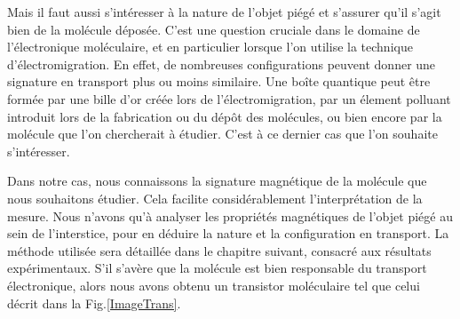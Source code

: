 Mais il faut aussi s'intéresser à la nature de l'objet piégé et s'assurer qu'il s'agit bien de la molécule déposée. C'est une question cruciale dans le domaine de l'électronique moléculaire, et en particulier lorsque l'on utilise la technique d'électromigration. En effet, de nombreuses configurations peuvent donner une signature en transport plus ou moins similaire. Une boîte quantique peut \^etre formée par une bille d'or créée lors de l'électromigration, par un élement polluant introduit lors de la fabrication ou du dép\^ot des molécules, ou bien encore par la molécule que l'on chercherait à étudier. C'est à ce dernier cas que l'on souhaite s'intéresser.

Dans notre cas, nous connaissons la signature magnétique de la molécule que nous souhaitons étudier. Cela facilite considérablement l'interprétation de la mesure. Nous n'avons qu'à analyser les propriétés magnétiques de l'objet piégé au sein de l'interstice, pour en déduire la nature et la configuration en transport. La méthode utilisée sera détaillée dans le chapitre suivant, consacré aux résultats expérimentaux.  S'il s'avère que la molécule est bien responsable du transport électronique, alors nous avons obtenu un transistor moléculaire tel que celui décrit dans la Fig.\ref{ImageTrans}.


